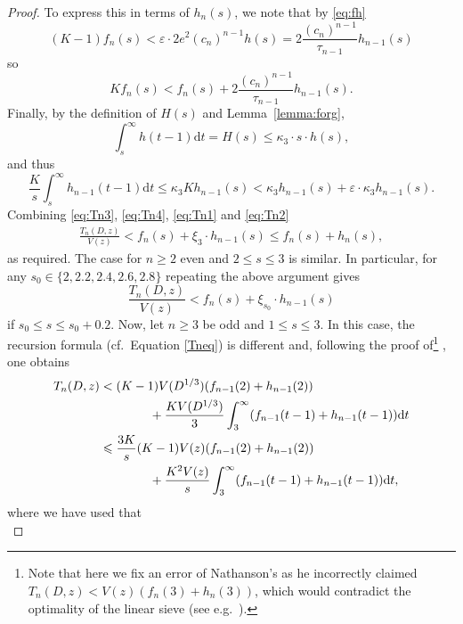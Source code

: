 \documentclass[12pt]{amsart}
\begin{document}
\begin{proof}
To express this in terms of $h_{n}(s)$, we note that by \eqref{eq:fh}
\begin{equation*}
    (K-1)f_n(s)<\varepsilon\cdot 2e^2(c_{n})^{n-1}h(s)=2 \frac{(c_{n})^{n-1}}{\tau_{n-1}}h_{n-1}(s)
\end{equation*}
so
\begin{equation}\label{eq:Tn1}
Kf_n(s)< f_n(s)+2 \frac{(c_{n})^{n-1}}{\tau_{n-1}}h_{n-1}(s).
\end{equation}
Finally, by the definition of $H(s)$ and Lemma~\ref{lemma:forg},
\begin{equation*}
    \int_s^{\infty} h(t-1)\mathrm{d}t=H(s)\le \kappa_3\cdot s\cdot h(s),
\end{equation*}
and thus 
\begin{equation}
\label{eq:Tn2}
    \frac{K}{s}\int_s^{\infty} h_{n-1}(t-1)\mathrm{d}t\le \kappa_3 K h_{n-1}(s)<\kappa_3h_{n-1}(s)+\varepsilon\cdot\kappa_3 h_{n-1}(s).
\end{equation}
Combining \eqref{eq:Tn3}, \eqref{eq:Tn4}, \eqref{eq:Tn1} and \eqref{eq:Tn2} 
\begin{align*}
    \frac{T_n(D,z)}{V(z)}<f_n(s)+\xi_3\cdot h_{n-1}(s)\le f_n(s)+h_n(s),
\end{align*}
as required. The case for $n\ge 2$ even and $2\le s\le 3$ is similar. In particular, for any $s_0\in\{2,2.2,2.4,2.6,2.8\}$ repeating the above argument gives
\begin{equation*}
    \frac{T_n(D,z)}{V(z)}<f_n(s)+\xi_{s_0}\cdot h_{n-1}(s)
\end{equation*}
if $s_0\le s\le s_0+0.2$. Now, let $n\ge 3$ be odd and $1 \le s \le 3$. In this case, the recursion formula (cf.\ Equation \ref{Tneq}) is different and, following the proof of\footnote{Note that here we fix an error of Nathanson's as he incorrectly claimed $T_n(D,z)<V(z)(f_n(3)+h_n(3))$, which would contradict the optimality of the linear sieve (see e.g.\ \cite[Section 12.3]{Opera}).} \cite[Theorem 9.5]{Nathanson}, one obtains
\begin{align}
    T_n(D,z)&< (K-1)V(D^{1/3})(f_{n-1}(2)+h_{n-1}(2))\notag\\
    &\qquad\qquad+\frac{KV(D^{1/3})}{3}\int_{3}^{\infty}(f_{n-1}(t-1)+h_{n-1}(t-1))\mathrm{d}t\notag\\
    &\le \frac{3K}{s}(K-1)V(z)(f_{n-1}(2)+h_{n-1}(2))\notag\\
    &\qquad\qquad+\frac{K^2V(z)}{s}\int_{3}^{\infty}(f_{n-1}(t-1)+h_{n-1}(t-1))\mathrm{d}t,
\end{align}
where we have used that 
\begin{equation*}

\end{equation*}
\end{proof}
\end{document}
